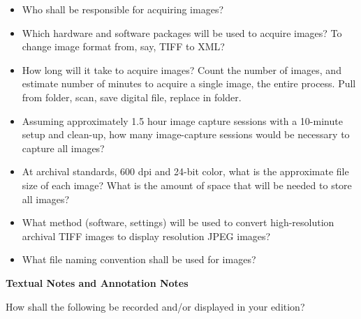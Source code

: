 \documentclass[9pt,oneside,notitlepageletterpaperopenright]{article}
\begin{document}
\begin{itemize}
\itemsep1pt\parskip0pt
\item
  Who shall be responsible for acquiring images?
\item
  Which hardware and software packages will be used to acquire images?
  To change image format from, say, TIFF to XML?
\item
  How long will it take to acquire images? Count the number of images,
  and estimate number of minutes to acquire a single image, the entire
  process. Pull from folder, scan, save digital file, replace in folder.
\item
  Assuming approximately 1.5 hour image capture sessions with a
  10-minute setup and clean-up, how many image-capture sessions would be
  necessary to capture all images?
\item
  At archival standards, 600 dpi and 24-bit color, what is the
  approximate file size of each image? What is the amount of space that
  will be needed to store all images?
\item
  What method (software, settings) will be used to convert
  high-resolution archival TIFF images to display resolution JPEG
  images?
\item
  What file naming convention shall be used for images?
\end{itemize}

\textbf{Textual Notes and Annotation Notes}

How shall the following be recorded and/or displayed in your edition?
\end{document}
